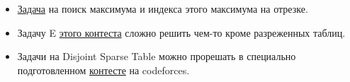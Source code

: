 \begin{itemize}
    \item \href{https://informatics.msk.ru/mod/statements/view.php?id=597#1}{Задача} на поиск максимума и индекса этого максимума на отрезке.

    \item Задачу E \href{https://codeforces.com/gym/100093}{этого контеста} сложно решить чем-то кроме разреженных таблиц.

    \item Задачи на Disjoint Sparse Table можно прорешать в специально подготовленном \href{https://codeforces.com/group/1rv4rhCsHp/contest/102954}{контесте} на codeforces.   
\end{itemize}


